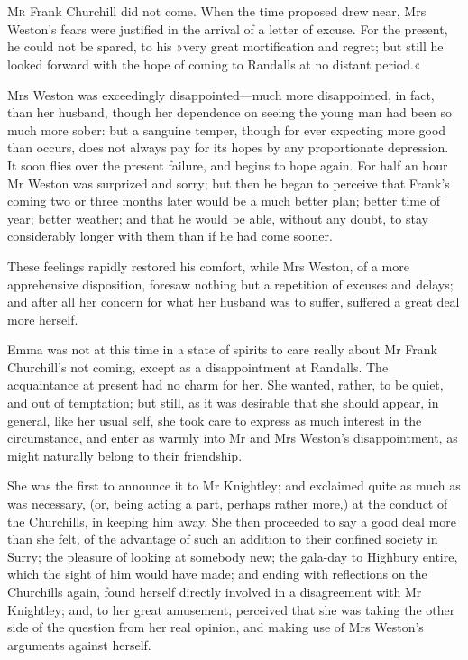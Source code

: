 \chapter[Chapter \thechapter]{}
\lettrine[lines=4,lraise=0.3]{M}{r} Frank Churchill did not come. When the time proposed drew near, Mrs Weston's fears were justified in the arrival of a letter of excuse. For the present, he could not be spared, to his »very great mortification and regret; but still he looked forward with the hope of coming to Randalls at no distant period.«

Mrs Weston was exceedingly disappointed—much more disappointed, in fact, than her husband, though her dependence on seeing the young man had been so much more sober: but a sanguine temper, though for ever expecting more good than occurs, does not always pay for its hopes by any proportionate depression. It soon flies over the present failure, and begins to hope again. For half an hour Mr Weston was surprized and sorry; but then he began to perceive that Frank's coming two or three months later would be a much better plan; better time of year; better weather; and that he would be able, without any doubt, to stay considerably longer with them than if he had come sooner.

These feelings rapidly restored his comfort, while Mrs Weston, of a more apprehensive disposition, foresaw nothing but a repetition of excuses and delays; and after all her concern for what her husband was to suffer, suffered a great deal more herself.

Emma was not at this time in a state of spirits to care really about Mr Frank Churchill's not coming, except as a disappointment at Randalls. The acquaintance at present had no charm for her. She wanted, rather, to be quiet, and out of temptation; but still, as it was desirable that she should appear, in general, like her usual self, she took care to express as much interest in the circumstance, and enter as warmly into Mr and Mrs Weston's disappointment, as might naturally belong to their friendship.

She was the first to announce it to Mr Knightley; and exclaimed quite as much as was necessary, (or, being acting a part, perhaps rather more,) at the conduct of the Churchills, in keeping him away. She then proceeded to say a good deal more than she felt, of the advantage of such an addition to their confined society in Surry; the pleasure of looking at somebody new; the gala-day to Highbury entire, which the sight of him would have made; and ending with reflections on the Churchills again, found herself directly involved in a disagreement with Mr Knightley; and, to her great amusement, perceived that she was taking the other side of the question from her real opinion, and making use of Mrs Weston's arguments against herself.

